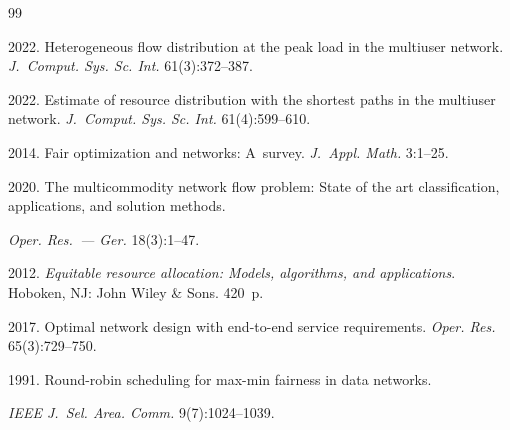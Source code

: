 {\small\frenchspacing


{ %




\begin{thebibliography}{99}





\vspace*{-2pt}









 2022. Heterogeneous flow distribution at the peak load in the multiuser network. \textit{J.~Comput. Sys. Sc. Int.} 61(3):372--387.  






 2022. Estimate of resource distribution with the shortest paths  in the multiuser network. \textit{J.~Comput. Sys. Sc. Int.} 61(4):599--610.




 2014. Fair optimization and networks: A~survey. \textit{J.~Appl. Math.} 3:1--25.






  2020. The multicommodity network flow problem: State of the art classification, applications, and solution methods. 


  \textit{Oper. Res.~--- Ger.} 18(3):1--47.




 2012. \textit{Equitable resource allocation: Models, algorithms, and applications}. Hoboken, NJ: John Wiley \& Sons. 420~p.




 2017. Optimal network design with end-to-end service requirements. \textit{Oper. Res.} 65(3):729--750. 




 1991. Round-robin scheduling for max-min fairness in data networks. 


\textit{IEEE J.~Sel. Area. Comm.} 9(7):1024--1039. 



\end{thebibliography}}}
